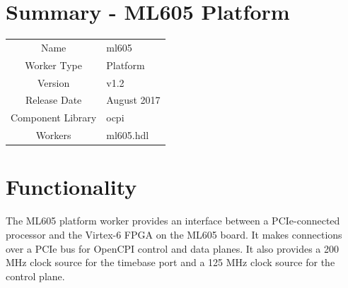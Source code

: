 \documentclass{article}
\author{} %
\date{Version \docVersion} %
\title{\docTitle}
\def\docVersion{1.2}
\def\comp{ml605}
\def\Comp{ML605 Platform}
\begin{document}
\section*{Summary - \Comp}
\begin{tabular}{|c|M{13.5cm}|}
	\hline
	                  &                                                    \\
	\hline
	Name              & \comp                                              \\
	\hline
	Worker Type       & Platform                                           \\
	\hline
	Version           & v\docVersion \\
	\hline
	Release Date      & August 2017 \\
	\hline
	Component Library & ocpi                                        \\
	\hline
	Workers & \comp.hdl                                        \\
	\hline
\end{tabular}

\section*{Functionality}
\begin{flushleft}
	The ML605 platform worker provides an interface between a PCIe-connected processor and the Virtex-6 FPGA on the ML605 board. It makes connections over a PCIe bus for OpenCPI control and data planes. It also provides a 200 MHz clock source for the timebase port and a 125 MHz clock source for the control plane.
\end{flushleft}
\end{document}
